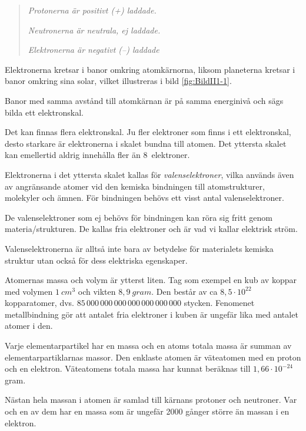 \begin{quote}
\emph{Protonerna är positivt (+) laddade.}

\emph{Neutronerna är neutrala, ej laddade.}

\emph{Elektronerna är negativt (--) laddade}
\end{quote}


Elektronerna kretsar i banor omkring atomkärnorna, liksom
planeterna kretsar i banor omkring sina solar, vilket illustreras i bild
\ref{fig:BildII1-1}.

Banor med samma avstånd till atomkärnan är på samma energinivå och sägs bilda
ett elektronskal.

Det kan finnas flera elektronskal.
Ju fler elektroner som finns i ett elektronskal, desto starkare är elektronerna
i skalet bundna till atomen.
Det yttersta skalet kan emellertid aldrig innehålla fler än 8~elektroner.

Elektronerna i det yttersta skalet kallas för \emph{valenselektroner}, vilka
används även av angränsande atomer vid den kemiska bindningen till
atomstrukturer, molekyler och ämnen.
För bindningen behövs ett visst antal valenselektroner.

De valenselektroner som ej behövs för bindningen kan röra sig fritt genom
materia/strukturen.
De kallas fria elektroner och är vad vi kallar elektrisk ström.

Valenselektronerna är alltså inte bara av betydelse för materialets kemiska
struktur utan också för dess elektriska egenskaper.

Atomernas massa och volym är ytterst liten.
Tag som exempel en kub av koppar med volymen \(1\ cm^3\) och vikten
\(8,9\ gram\).
Den består av ca \(8,5 \cdot 10^{22}\) kopparatomer, dvs.
\(85\, 000\, 000\, 000\, 000\, 000\, 000\, 000\) stycken.
Fenomenet metallbindning gör att antalet fria elektroner i kuben är ungefär lika
med antalet atomer i den.

Varje elementarpartikel har en massa och en atoms totala massa är summan av
elementarpartiklarnas massor.
Den enklaste atomen är väteatomen med en proton och en elektron.
Väteatomens totala massa har kunnat beräknas till \(1,66 \cdot 10^{-24}\) gram.

Nästan hela massan i atomen är samlad till kärnans protoner och neutroner.
Var och en av dem har en massa som är ungefär 2000 gånger större än massan i en
elektron.

